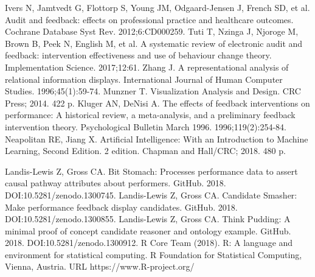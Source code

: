 \documentclass{amia}
\begin{document}

\begin{thebibliography}{1}
\setlength\itemsep{-0.1em}

Ivers N, Jamtvedt G, Flottorp S, Young JM, Odgaard-Jensen J, French SD, et al. Audit and feedback: effects on professional practice and healthcare outcomes. Cochrane Database Syst Rev. 2012;6:CD000259. 
Tuti T, Nzinga J, Njoroge M, Brown B, Peek N, English M, et al. A systematic review of electronic audit and feedback: intervention effectiveness and use of behaviour change theory. Implementation Science. 2017;12:61.
Zhang J. A representational analysis of relational information displays. International Journal of Human Computer Studies. 1996;45(1):59-74.
Munzner T. Visualization Analysis and Design. CRC Press; 2014. 422 p. 
Kluger AN, DeNisi A. The effects of feedback interventions on performance: A historical review, a meta-analysis, and a preliminary feedback intervention theory. Psychological Bulletin March 1996. 1996;119(2):254-84.
Neapolitan RE, Jiang X. Artificial Intelligence: With an Introduction to Machine Learning, Second Edition. 2 edition. Chapman and Hall/CRC; 2018. 480 p. 

Landis-Lewis Z, Gross CA. Bit Stomach: Processes performance data to assert causal pathway attributes about performers. GitHub. 2018. DOI:10.5281/zenodo.1300745.
Landis-Lewis Z, Gross CA. Candidate Smasher: Make performance feedback display candidates. GitHub. 2018. DOI:10.5281/zenodo.1300855.
Landis-Lewis Z, Gross CA. Think Pudding: A minimal proof of concept candidate reasoner and ontology example. GitHub. 2018. DOI:10.5281/zenodo.1300912.
R Core Team (2018). R: A language and environment for statistical computing. R Foundation for Statistical Computing, Vienna, Austria. URL https://www.R-project.org/

\end{thebibliography}
\end{document}
